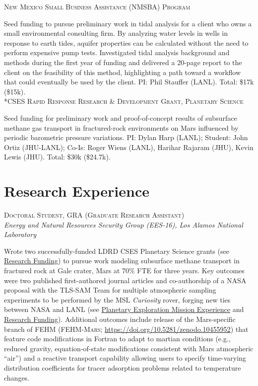 \documentclass[11pt, letterpaper]{article}
\newcommand{\years}[1]{\marginnote{\scriptsize #1}}
\begin{document}
\years{2020}\textsc{New Mexico Small Business Assistance (NMSBA) Program}

	Seed funding to pursue preliminary work in tidal analysis for a client who
	owns a small environmental consulting firm. By analyzing water levels in
	wells in response to earth tides, aquifer properties can be calculated
	without the need to perform expensive pump tests.  Investigated tidal
	analysis background and methods during the first year of funding and
	delivered a 20-page report to the client on the feasibility of this method,
	highlighting a path toward a workflow that could eventually be used by the
	client.   
	PI: Phil Stauffer (LANL). Total: \$17k (\$15k). \\

\years{2020}\textsc{*CSES Rapid Response Research \& Development Grant, Planetary
Science}

	Seed funding for preliminary work and proof-of-concept results of
	subsurface methane gas transport in fractured-rock environments on Mars
	influenced by periodic barometric pressure variations.
    PI: Dylan Harp (LANL); Student: John Ortiz (JHU-LANL); Co-Is: Roger Wiens
    (LANL), Harihar Rajaram (JHU), Kevin Lewis (JHU). Total: \$30k (\$24.7k).


\section*{Research Experience}
\setlength{\parindent}{14pt}
\years{2020 - pres.}\textsc{Doctoral Student, GRA (Graduate Research Assistant)}\\
\textit{Energy and Natural Resources Security Group (EES-16), Los Alamos National Laboratory}

    \vspace{3pt} \noindent  
    Wrote two successfully-funded LDRD CSES Planetary Science grants (see
    \hyperref[sec:funding]{Research Funding}) to pursue work modeling
    subsurface methane transport in fractured rock at Gale crater, Mars at 70\%
    FTE for three years. Key outcomes were two published first-authored journal
    articles and co-authorship of a NASA proposal with the TLS-SAM Team for
    multiple atmospheric sampling experiments to be performed by the MSL
    \textit{Curiosity} rover, forging new ties between NASA and LANL (see
    \hyperref[sec:missions]{Planetary Exploration Mission Experience} and
    \hyperref[sec:funding]{Research Funding}). Additional outcomes include release
    of the Mars-specific branch of FEHM (\textsc{FEHM-Mars};
    \href{https://doi.org/10.5281/zenodo.10455952}{https://doi.org/10.5281/zenodo.10455952})
    that feature code modifications in Fortran to adapt to martian conditions (e.g., reduced
        gravity, equation-of-state modifications consistent with Mars atmospheric
    ``air'') and a reactive transport capability allowing users to specify
    time-varying distribution coefficients for tracer adsorption problems related
    to temperature changes.
\end{document}
